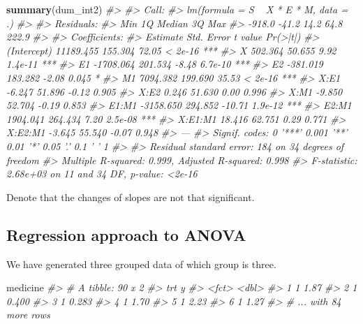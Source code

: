 \documentclass[]{book}
\newenvironment{Shaded}{\begin{snugshade}}{\end{snugshade}}
\newcommand{\CommentTok}[1]{\textcolor[rgb]{0.56,0.35,0.01}{\textit{#1}}}
\newcommand{\KeywordTok}[1]{\textcolor[rgb]{0.13,0.29,0.53}{\textbf{#1}}}
\newcommand{\NormalTok}[1]{#1}
\theoremstyle{definition}
\theoremstyle{definition}
\theoremstyle{definition}
\theoremstyle{remark}
\begin{document}
\begin{Shaded}
\begin{Highlighting}[]
\KeywordTok{summary}\NormalTok{(dum_int2)}
\CommentTok{#> }
\CommentTok{#> Call:}
\CommentTok{#> lm(formula = S ~ X * E * M, data = .)}
\CommentTok{#> }
\CommentTok{#> Residuals:}
\CommentTok{#>    Min     1Q Median     3Q    Max }
\CommentTok{#> -918.0  -41.2   14.2   64.8  222.9 }
\CommentTok{#> }
\CommentTok{#> Coefficients:}
\CommentTok{#>              Estimate Std. Error t value Pr(>|t|)    }
\CommentTok{#> (Intercept) 11189.455    155.304   72.05  < 2e-16 ***}
\CommentTok{#> X             502.364     50.655    9.92  1.4e-11 ***}
\CommentTok{#> E1          -1708.064    201.534   -8.48  6.7e-10 ***}
\CommentTok{#> E2           -381.019    183.282   -2.08    0.045 *  }
\CommentTok{#> M1           7094.382    199.690   35.53  < 2e-16 ***}
\CommentTok{#> X:E1           -6.247     51.896   -0.12    0.905    }
\CommentTok{#> X:E2            0.246     51.630    0.00    0.996    }
\CommentTok{#> X:M1           -9.850     52.704   -0.19    0.853    }
\CommentTok{#> E1:M1       -3158.650    294.852  -10.71  1.9e-12 ***}
\CommentTok{#> E2:M1        1904.041    264.434    7.20  2.5e-08 ***}
\CommentTok{#> X:E1:M1        18.416     62.751    0.29    0.771    }
\CommentTok{#> X:E2:M1        -3.645     55.540   -0.07    0.948    }
\CommentTok{#> ---}
\CommentTok{#> Signif. codes:  0 '***' 0.001 '**' 0.01 '*' 0.05 '.' 0.1 ' ' 1}
\CommentTok{#> }
\CommentTok{#> Residual standard error: 184 on 34 degrees of freedom}
\CommentTok{#> Multiple R-squared:  0.999,  Adjusted R-squared:  0.998 }
\CommentTok{#> F-statistic: 2.68e+03 on 11 and 34 DF,  p-value: <2e-16}
\end{Highlighting}
\end{Shaded}

Denote that the changes of slopes are not that significant.

\hypertarget{regression-approach-to-anova}{%
\subsection{Regression approach to ANOVA}\label{regression-approach-to-anova}}

We have generated three grouped data of which group is three.

\begin{Shaded}
\begin{Highlighting}[]
\NormalTok{medicine}
\CommentTok{#> # A tibble: 90 x 2}
\CommentTok{#>   trt       y}
\CommentTok{#>   <fct> <dbl>}
\CommentTok{#> 1 1     1.87 }
\CommentTok{#> 2 1     0.400}
\CommentTok{#> 3 1     0.283}
\CommentTok{#> 4 1     1.70 }
\CommentTok{#> 5 1     2.23 }
\CommentTok{#> 6 1     1.27 }
\CommentTok{#> # ... with 84 more rows}
\end{Highlighting}
\end{Shaded}
\end{document}
